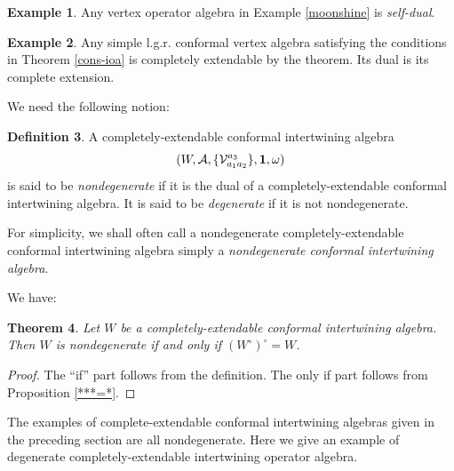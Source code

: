 \documentclass{amsproc}
\newtheorem{thm}{Theorem}[section]
\theoremstyle{definition}
\newtheorem{defn}[thm]{Definition}
\newtheorem{expl}[thm]{Example}
\theoremstyle{remark}
\numberwithin{equation}{section}
\begin{document}
\begin{expl}
{\rm Any vertex operator algebra in Example \ref{moonshine} 
is {\it self-dual}.}
\end{expl}

\begin{expl}
{\rm Any simple l.g.r. conformal vertex algebra satisfying the conditions 
in Theorem \ref{cons-ioa} is completely extendable by the theorem.
Its dual is its complete extension.}
\end{expl}



We need the following notion:

\begin{defn}
{\rm A completely-extendable conformal intertwining algebra
$$(W, 
\mathcal{A}, \{\mathcal{V}_{a_{1}a_{2}}^{a_{3}}\}, {\bf 1}, 
\omega)$$
 is said to be {\it nondegenerate}
if it is the dual of a completely-extendable conformal intertwining 
algebra. It is said to be {\it degenerate} if it is not
nondegenerate.}
\end{defn}

For simplicity, we shall often call a nondegenerate 
completely-extendable conformal intertwining 
algebra simply a {\it nondegenerate conformal intertwining 
algebra}.

We have:

\begin{thm}
Let $W$ be a completely-extendable conformal intertwining algebra.
Then $W$ is nondegenerate if and only if $(W^{\circ})^{\circ}=W$.
\end{thm}
\begin{proof}
The ``if'' part follows from the definition. The only if part follows
from Proposition \ref{***=*}.
\end{proof}

The examples of complete-extendable
conformal intertwining  algebras given
in the preceding section are all nondegenerate.
Here we give an example of degenerate  completely-extendable 
intertwining operator algebra.
\end{document}
